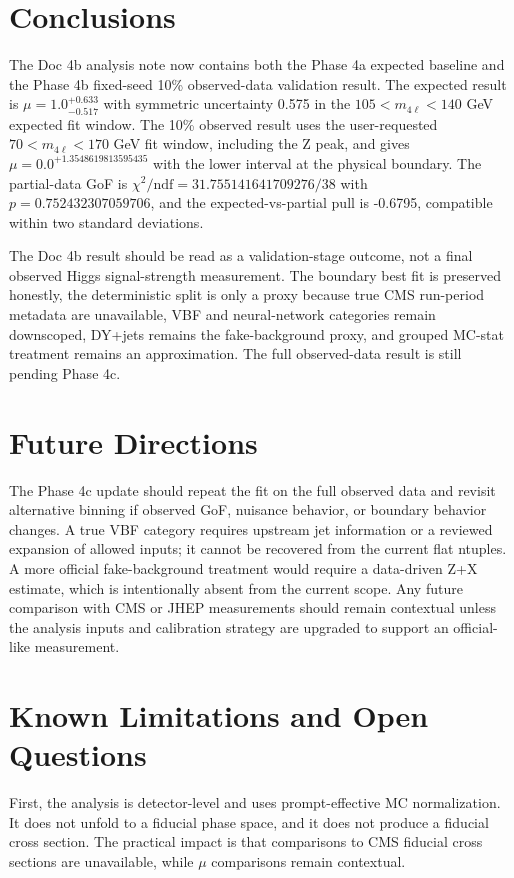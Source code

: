 \documentclass[11pt]{article}
\begin{document}
\section{Conclusions}
The Doc 4b analysis note now contains both the Phase 4a expected baseline and the Phase 4b fixed-seed 10\% observed-data validation result.
The expected result is $\mu=1.0^{+0.633}_{-0.517}$ with symmetric uncertainty 0.575 in the $105<m_{4\ell}<140$ GeV expected fit window.
The 10\% observed result uses the user-requested $70<m_{4\ell}<170$ GeV fit window, including the Z peak, and gives $\mu=0.0^{+1.3548619813595435}$ with the lower interval at the physical boundary. The partial-data GoF is $\chi^2/\mathrm{ndf}=31.755141641709276/38$ with $p=0.752432307059706$, and the expected-vs-partial pull is -0.6795, compatible within two standard deviations.

The Doc 4b result should be read as a validation-stage outcome, not a final observed Higgs signal-strength measurement. The boundary best fit is preserved honestly, the deterministic split is only a proxy because true CMS run-period metadata are unavailable, VBF and neural-network categories remain downscoped, DY+jets remains the fake-background proxy, and grouped MC-stat treatment remains an approximation. The full observed-data result is still pending Phase 4c.
\section{Future Directions}
The Phase 4c update should repeat the fit on the full observed data and revisit alternative binning if observed GoF, nuisance behavior, or boundary behavior changes. A true VBF category requires upstream jet information or a reviewed expansion of allowed inputs; it cannot be recovered from the current flat ntuples. A more official fake-background treatment would require a data-driven Z+X estimate, which is intentionally absent from the current scope. Any future comparison with CMS or JHEP measurements should remain contextual unless the analysis inputs and calibration strategy are upgraded to support an official-like measurement.
\section{Known Limitations and Open Questions}
First, the analysis is detector-level and uses prompt-effective MC normalization. It does not unfold to a fiducial phase space, and it does not produce a fiducial cross section. The practical impact is that comparisons to CMS fiducial cross sections are unavailable, while $\mu$ comparisons remain contextual.
\end{document}
